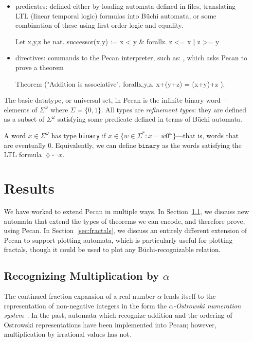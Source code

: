 \documentclass[10pt,usenames,dvipsnames]{article}
\begin{document}
\begin{itemize}
    \item predicates: defined either by loading automata defined in files, translating LTL (linear temporal logic) formulas into B\"uchi automata, or some combination of these using first order logic and equality.

\begin{pecan}
Let x,y,z be nat.
successor(x,y) := x < y & forallz. z <= x | z >= y
\end{pecan}

    \item directives: commands to the Pecan interpreter, such as: , which asks Pecan to prove a theorem
    
\begin{pecan}
Theorem ("Addition is associative", { forallx,y,z. x+(y+z) = (x+y)+z }).
\end{pecan}

\end{itemize}

The basic datatype, or universal set, in Pecan is the infinite binary word---elements of $\Sigma^{\omega}$ where $\Sigma = \{0,1\}$.
All types are \emph{refinement types}: they are defined as a subset of $\Sigma^{\omega}$ satisfying some predicate defined in terms of B\"uchi automata.
\begin{example}
A word $x \in \Sigma^\omega$ has type \texttt{binary} if $x \in \{ w \in \Sigma^* : x = w0^\omega \}$---that is, words that are eventually $0$.
Equivalently, we can define $\texttt{binary}$ as the words satisfying the LTL formula $\lozenge \square \neg x$.
\end{example}

\section{Results}

We have worked to extend Pecan in multiple ways.
In Section~\ref{sec:mul-by-alpha}, we discuss new automata that extend the types of theorems we can encode, and therefore prove, using Pecan.
In Section~\ref{sec:fractals}, we discuss an entirely different extension of Pecan to support plotting automata, which is particularly useful for plotting fractals, though it could be used to plot any B\"uchi-recognizable relation.

\subsection{Recognizing Multiplication by $\alpha$}\label{sec:mul-by-alpha}
The continued fraction expansion of a real number $\alpha$ lends itself to the representation of non-negative integers in the form the \emph{$\alpha$-Ostrowski numeration system}~\cite{auto_seq}.
In the past, automata which recognize addition and the ordering of Ostrowski representations have been implemented into Pecan; however, multiplication by irrational values has not.
\end{document}
